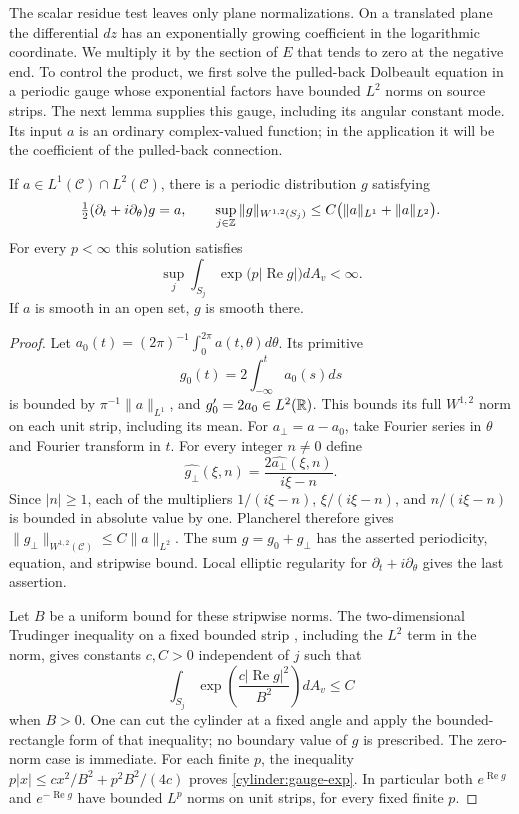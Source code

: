 The scalar residue test leaves only plane normalizations. On a
translated plane the differential $dz$ has an exponentially growing
coefficient in the logarithmic coordinate. We multiply it by the
section of $E$ that tends to zero at the negative end. To control the
product, we first solve the pulled-back Dolbeault equation in a periodic
gauge whose exponential factors have bounded $L^2$ norms on source
strips. The next lemma supplies this gauge, including its angular
constant mode. Its input $a$ is an ordinary complex-valued function;
in the application it will be the coefficient of the pulled-back
connection.

\begin{lemma}
\label{cylinder:gauge}
If $a\in L^1(\mathcal C)\cap L^2(\mathcal C)$, there is a periodic
distribution $g$ satisfying
\[
 \tfrac12(\partial_t+i\partial_\theta)g=a,
 \qquad
 \sup_{j\in\mathbb Z}\|g\|_{W^{1,2}(S_j)}
       \leq C\bigl(\|a\|_{L^1}+\|a\|_{L^2}\bigr).
\]
For every $p<\infty$ this solution satisfies
\begin{equation}\label{cylinder:gauge-exp}
 \sup_j\int_{S_j}\exp\bigl(p|\operatorname{Re}g|\bigr)dA_v<\infty.
\end{equation}
If $a$ is smooth in an open set, $g$ is smooth there.
\end{lemma}

\begin{proof}
Let $a_0(t)=(2\pi)^{-1}\int_0^{2\pi}a(t,\theta)d\theta$.
Its primitive
\[
 g_0(t)=2\int_{-\infty}^t a_0(s)ds
\]
is bounded by $\pi^{-1}\|a\|_{L^1}$, and
$g_0'=2a_0\in L^2(\mathbb R)$.  This bounds its full $W^{1,2}$ norm on
each unit strip, including its mean.  For $a_\perp=a-a_0$, take
Fourier series in $\theta$ and Fourier transform in $t$.  For every
integer $n\ne0$ define
\[
 \widehat{g_\perp}(\xi,n)
       =\frac{2\widehat{a_\perp}(\xi,n)}{i\xi-n}.
\]
Since $|n|\geq1$, each of the multipliers
$1/(i\xi-n)$, $\xi/(i\xi-n)$, and $n/(i\xi-n)$ is bounded in
absolute value by one.  Plancherel therefore gives
$\|g_\perp\|_{W^{1,2}(\mathcal C)}\leq C\|a\|_{L^2}$.
The sum $g=g_0+g_\perp$ has the asserted periodicity, equation, and
stripwise bound.  Local elliptic regularity for
$\partial_t+i\partial_\theta$ gives the last assertion.

Let $B$ be a uniform bound for these stripwise norms.  The
two-dimensional Trudinger inequality on a fixed bounded strip
\cite{Trudinger1967}, including the $L^2$ term in the norm, gives
constants $c,C>0$ independent of $j$ such that
\[
 \int_{S_j}\exp\left(\frac{c|\operatorname{Re}g|^2}{B^2}\right)dA_v
       \leq C
\]
when $B>0$.  One can cut the cylinder at a fixed angle and apply the
bounded-rectangle form of that inequality; no boundary value of $g$
is prescribed.  The zero-norm case is immediate.  For each finite
$p$, the inequality
$p|x|\leq cx^2/B^2+p^2B^2/(4c)$ proves
\eqref{cylinder:gauge-exp}.  In particular both
$e^{\operatorname{Re}g}$ and $e^{-\operatorname{Re}g}$ have bounded
$L^p$ norms on unit strips, for every fixed finite $p$.
\end{proof}

